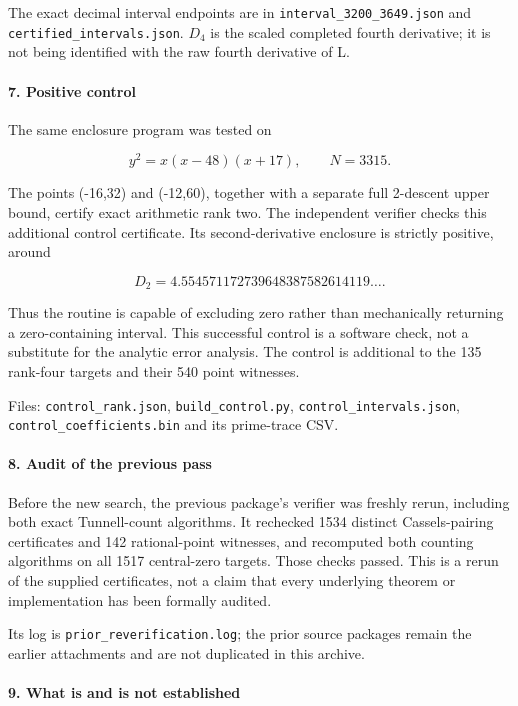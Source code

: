 \documentclass[11pt]{article}
\begin{document}
The exact decimal interval endpoints are in \nolinkurl{interval_3200_3649.json} and \nolinkurl{certified_intervals.json}. \(D_4\) is the scaled completed fourth derivative; it is not being identified with the raw fourth derivative of L.

\paragraph{7. Positive control}

The same enclosure program was tested on

\[
y^2=x(x-48)(x+17),\qquad N=3315.
\]

The points (-16,32) and (-12,60), together with a separate full 2-descent upper bound, certify exact arithmetic rank two. The independent verifier checks this additional control certificate. Its second-derivative enclosure is strictly positive, around

\[
D_2=4.554571172739648387582614119\ldots.
\]

Thus the routine is capable of excluding zero rather than mechanically returning a zero-containing interval. This successful control is a software check, not a substitute for the analytic error analysis. The control is additional to the 135 rank-four targets and their 540 point witnesses.

Files: \nolinkurl{control_rank.json}, \nolinkurl{build_control.py}, \nolinkurl{control_intervals.json}, \nolinkurl{control_coefficients.bin} and its prime-trace CSV.

\paragraph{8. Audit of the previous pass}

Before the new search, the previous package's verifier was freshly rerun, including both exact Tunnell-count algorithms. It rechecked 1534 distinct Cassels-pairing certificates and 142 rational-point witnesses, and recomputed both counting algorithms on all 1517 central-zero targets. Those checks passed. This is a rerun of the supplied certificates, not a claim that every underlying theorem or implementation has been formally audited.

Its log is \nolinkurl{prior_reverification.log}; the prior source packages remain the earlier attachments and are not duplicated in this archive.

\paragraph{9. What is and is not established}
\end{document}
